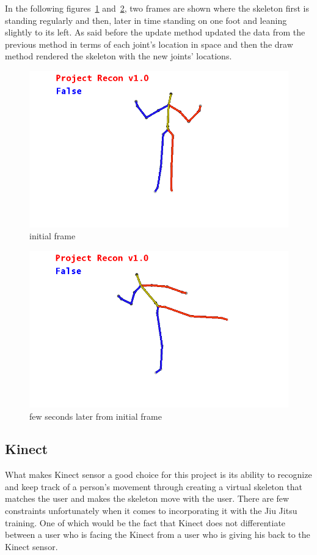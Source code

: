In the following figures~\ref{skeletonframe1} and~\ref{skeletonframe2}, two frames are shown where the skeleton first is standing regularly and then, later in time standing on one foot and leaning slightly to its left. As said before the update method updated the data from the previous method in terms of each joint's location in space and then the draw method rendered the skeleton with the new joints' locations.

\begin{figure}[!htbp]
\centering
\includegraphics[width=1\textwidth]{images/skeleton_frame1.png}
\caption{initial frame}
\label{skeletonframe1}
\end{figure}

\begin{figure}[!htbp]
\centering
\includegraphics[width=1\textwidth]{images/skeleton_frame2.png}
\caption{few seconds later from initial frame}
\label{skeletonframe2}
\end{figure}

\subsection{Kinect}
What makes Kinect sensor a good choice for this project is its ability to recognize and keep track of a person's movement through creating a virtual skeleton that matches the user and makes the skeleton move with the user. There are few constraints unfortunately when it comes to incorporating it with the Jiu Jitsu training. One of which would be the fact that Kinect does not differentiate between a user who is facing the Kinect from a user who is giving his back to the Kinect sensor.


